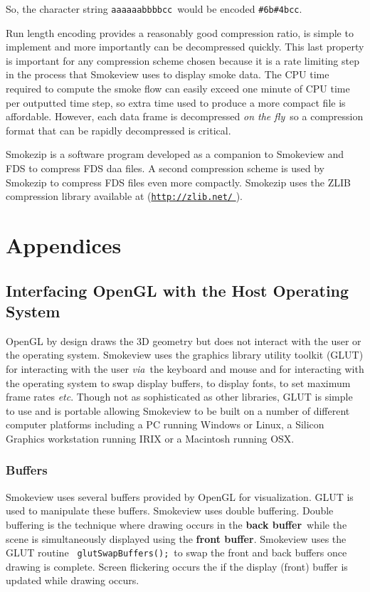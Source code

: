 \documentclass[11pt,twoside]{book}
\newcommand{\hhref}[1]{\href{#1}{{\tt #1}
}}
\begin{document}
So, the character string {\tt aaaaaabbbbcc}\ would be encoded {\tt \#6b\#4bcc}.

Run length encoding provides a reasonably good compression ratio, is simple to implement and more importantly can be decompressed quickly.
This last property is important for any compression scheme chosen because it is a rate limiting step in the process that Smokeview uses to display smoke data.
The CPU time required to compute the
smoke flow can easily exceed one minute of CPU time per outputted
time step, so extra time used to produce a more compact file is
affordable. However, each data frame is decompressed {\em on the
fly}\ so a compression format that can be rapidly decompressed is
critical.

Smokezip is a software program developed as a companion to Smokeview and FDS to compress FDS daa files.
A second compression scheme is used by Smokezip to compress FDS files even more compactly.  Smokezip uses the ZLIB compression library available at (\hhref{http://zlib.net/}).

%
%

\part{Appendices}
\appendix

%
%

\chapter{Interfacing OpenGL with the Host Operating System}
OpenGL by design draws
the 3D geometry but does not interact with the user or the
operating system. Smokeview uses the graphics library utility
toolkit (GLUT) for interacting with the user {\em via}\ the
keyboard and mouse and for interacting with the operating system
to swap display buffers, to display fonts, to set maximum frame
rates {\em etc}. Though not as sophisticated as other libraries,
GLUT is simple to use and is portable allowing Smokeview to be
built on a number of different computer platforms including a PC
running Windows or Linux, a Silicon Graphics workstation running
IRIX or a Macintosh running OSX.

\section{Buffers} Smokeview uses several buffers provided by
OpenGL for visualization.  GLUT is used to manipulate these
buffers. Smokeview uses double buffering.  Double buffering is the technique where drawing occurs in the
{\bf back buffer}\ while the scene is simultaneously displayed using
the {\bf front buffer}. Smokeview uses the GLUT routine {\tt
glutSwapBuffers();}\ to swap the front and back buffers once
drawing is complete. Screen flickering occurs the if the display (front) buffer is updated while drawing occurs.
\end{document}

